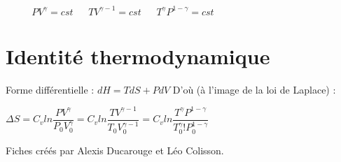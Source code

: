 \documentclass[9pt,twocolumn]{article}
\begin{document}
$\>\>\>\>\>\>\>\>\>\>\>\>PV^{\gamma}=cst  \>\>\>\>\>\>\> TV^{\gamma-1}=cst   \>\>\>\>\>\>\> T^{\gamma}P^{1-\gamma}=cst$


\section{Identité thermodynamique}

Forme différentielle : $\boxed{dH=TdS+PdV}$
\bigbreak
D'où (à l'image de la loi de Laplace) :

$\Delta S=C_v ln \dfrac{PV^{\gamma}}{P_0 V_0^{\gamma}}=C_v ln \dfrac{TV^{\gamma-1}}{T_0 V_0^{\gamma-1}}=C_v ln \dfrac{T^{\gamma}P^{1-\gamma}}{T_0^{\gamma} !P_0^{1-\gamma}}$ 


\vfill
\footnotesize{Fiches créés par Alexis Ducarouge et Léo Colisson.}
\end{document}
